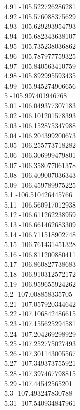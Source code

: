 {4.91	-105.522726286281\\
4.92	-105.576088375629\\
4.93	-105.629293954793\\
4.94	-105.682343638107\\
4.95	-105.735238036862\\
4.96	-105.787977759325\\
4.97	-105.840563410759\\
4.98	-105.892995593435\\
4.99	-105.945274906656\\
5	-105.997401946768\\
5.01	-106.049377307183\\
5.02	-106.101201578393\\
5.03	-106.152875347988\\
5.04	-106.204399200673\\
5.05	-106.255773718282\\
5.06	-106.306999479801\\
5.07	-106.358077061378\\
5.08	-106.409007036343\\
5.09	-106.459789975225\\
5.1	-106.510426445766\\
5.11	-106.560917012938\\
5.12	-106.611262238959\\
5.13	-106.661462683309\\
5.14	-106.711518902748\\
5.15	-106.761431451328\\
5.16	-106.811200880411\\
5.17	-106.860827738683\\
5.18	-106.910312572172\\
5.19	-106.959655924262\\
5.2	-107.008858335705\\
5.21	-107.057920344642\\
5.22	-107.106842486615\\
5.23	-107.155625294581\\
5.24	-107.204269298929\\
5.25	-107.252775027493\\
5.26	-107.301143005567\\
5.27	-107.349373755921\\
5.28	-107.397467798815\\
5.29	-107.44542565201\\
5.3	-107.493247830788\\
5.31	-107.540934847961\\
}

